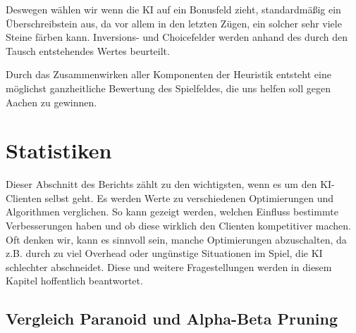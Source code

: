 \documentclass[12pt,a4paper,bibliography=totocnumbered,listof=totocnumbered]{scrartcl}
\begin{document}
	Deswegen wählen wir wenn die KI auf ein Bonusfeld zieht, standardmäßig ein Überschreibstein aus, da vor allem in den letzten Zügen, ein solcher sehr viele Steine färben kann. Inversions- und Choicefelder werden anhand des durch den Tausch entstehendes Wertes beurteilt.
	
	Durch das Zusammenwirken aller Komponenten der Heuristik entsteht eine möglichst ganzheitliche Bewertung des Spielfeldes, die uns helfen soll gegen Aachen zu gewinnen.

    \newpage
    \section{Statistiken}
    \vspace{1em}
	Dieser Abschnitt des Berichts zählt zu den wichtigsten, wenn es um den KI-Clienten selbst geht. Es werden Werte zu verschiedenen Optimierungen und Algorithmen verglichen. So kann gezeigt werden, welchen Einfluss bestimmte \grqq Verbesserungen\glqq{} haben und ob diese wirklich den Clienten kompetitiver machen. Oft denken wir, kann es sinnvoll sein, manche Optimierungen abzuschalten, da z.B. durch zu viel Overhead oder ungünstige Situationen im Spiel, die KI schlechter abschneidet. Diese und weitere Fragestellungen werden in diesem Kapitel hoffentlich beantwortet.



	

    \subsection{Vergleich Paranoid und Alpha-Beta Pruning}
    \vspace{1em}
\end{document}
